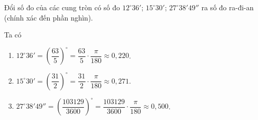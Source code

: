 \begin{bt}%
	Đổi số đo của các cung tròn có số đo $12^\circ 36'$; $15^\circ 30'$; $27^\circ 38'49''$ ra số đo ra-đi-an (chính xác đến phần nghìn).
	\loigiai
	{
		Ta có
		\begin{enumerate}[$\circ$]
			\item $12^\circ 36' = \left(\dfrac{63}{5}\right)^\circ = \dfrac{63}{5}\cdot \dfrac{\pi}{180} \approx 0{,}220$.
			\item $15^\circ 30' = \left(\dfrac{31}{2}\right)^\circ = \dfrac{31}{2}\cdot \dfrac{\pi}{180} \approx 0{,}271$.
			\item $27^\circ 38'49'' = \left(\dfrac{103129}{3600}\right)^\circ = \dfrac{103129}{3600}\cdot \dfrac{\pi}{180} \approx 0{,}500$.
		\end{enumerate}
	}
\end{bt}

